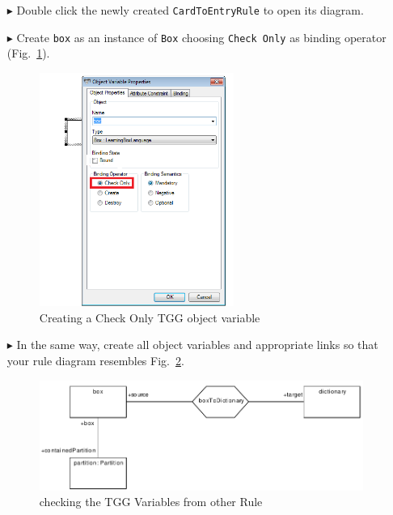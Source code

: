 \begin{enumerate}
\item[$\blacktriangleright$] Double click the newly created \texttt{CardToEntryRule} to open its diagram.
\item[$\blacktriangleright$] Create \texttt{box} as an instance of \texttt{Box} choosing \texttt{Check Only} as binding operator (Fig.~\ref{fig:bound_tgg_variable}).

\begin{figure}[htbp]
\begin{center}
  \includegraphics[width=0.6\textwidth]{pics/tggBilder/tggRule/tgg17}
  \caption{Creating a Check Only TGG object variable}  
  \label{fig:bound_tgg_variable}
\end{center}
\end{figure} 

\item[$\blacktriangleright$] In the same way, create all object variables and appropriate links so that your rule diagram resembles Fig.~\ref{fig:check_bound_variables}. 

\begin{figure}[htbp]
\begin{center}
  \includegraphics[width=\textwidth]{pics/tggBilder/tggRule/tgg18}
  \caption{checking the TGG Variables from other Rule }  
  \label{fig:check_bound_variables}
\end{center}
\end{figure}

\end{enumerate}

